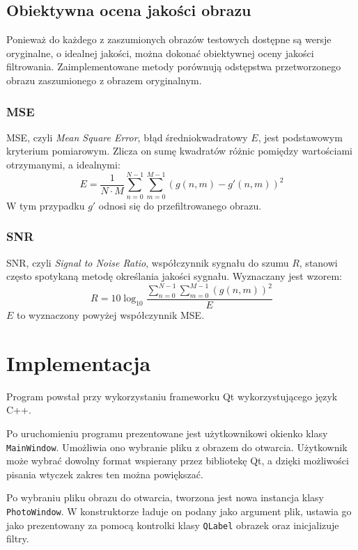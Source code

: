 \documentclass{classrep}
\begin{document}
\subsection{Obiektywna ocena jakości obrazu}
Ponieważ do każdego z zaszumionych obrazów testowych dostępne są wersje oryginalne, o idealnej jakości, można dokonać obiektywnej oceny jakości filtrowania. Zaimplementowane metody porównują odstępstwa przetworzonego obrazu zaszumionego z obrazem oryginalnym.

\subsubsection{MSE}
MSE, czyli \textit{Mean Square Error}, błąd średniokwadratowy $E$, jest podstawowym kryterium pomiarowym. Zlicza on sumę kwadratów różnic pomiędzy wartościami otrzymanymi, a idealnymi:
\begin{equation}
 E = \frac{1}{N \cdot M} \displaystyle \sum \limits_{n=0}^{N-1} \sum \limits_{m=0}^{M-1} \left(g\left(n, m\right) - g'\left(n, m\right) \right)^2
\end{equation}
W tym przypadku $g'$ odnosi się do przefiltrowanego obrazu.

\subsubsection{SNR}
SNR, czyli \textit{Signal to Noise Ratio}, współczynnik sygnału do szumu $R$, stanowi często spotykaną metodę określania jakości sygnału. Wyznaczany jest wzorem:
\begin{equation}
 R = 10 \log_{10} \frac{\displaystyle \sum \limits_{n=0}^{N-1} \sum \limits_{m=0}^{M-1} \left(g\left(n, m\right)\right)^2}{E}
\end{equation}
$E$ to wyznaczony powyżej współczynnik MSE.

\section{Implementacja}
Program powstał przy wykorzystaniu frameworku Qt wykorzystującego język C++.

Po uruchomieniu programu prezentowane jest użytkownikowi okienko klasy \texttt{MainWindow}. Umożliwia ono wybranie pliku z obrazem do otwarcia. Użytkownik może wybrać dowolny format wspierany przez bibliotekę Qt, a dzięki możliwości pisania wtyczek \ppauza zakres ten można powiększać.

Po wybraniu pliku obrazu do otwarcia, tworzona jest nowa instancja klasy \texttt{PhotoWindow}. W konstruktorze ładuje on podany jako argument plik, ustawia go jako prezentowany za pomocą kontrolki klasy \texttt{QLabel} obrazek oraz inicjalizuje filtry.
\end{document}
